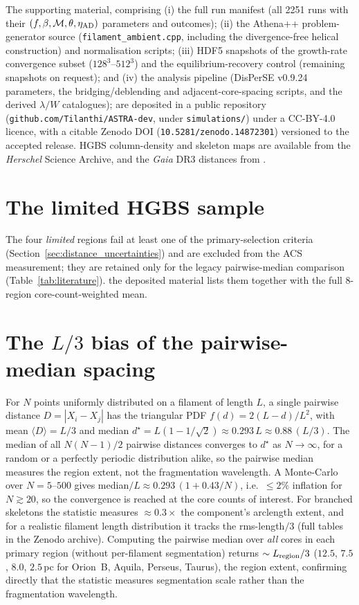 \documentclass[usenatbib,twoside,twocolumn]{mnras}
\begin{document}
The supporting material, comprising (i) the full run manifest (all 2251 runs with their $(f,\beta,\mathcal{M},\theta,\eta_{\rm AD})$ parameters and outcomes); (ii) the Athena++ problem-generator source (\texttt{filament\_ambient.cpp}, including the divergence-free helical construction) and normalisation scripts; (iii) HDF5 snapshots of the growth-rate convergence subset ($128^3$--$512^3$) and the equilibrium-recovery control (remaining snapshots on request); and (iv) the analysis pipeline (DisPerSE v0.9.24 parameters, the bridging/deblending and adjacent-core-spacing scripts, and the derived $\lambda/W$ catalogues); are deposited in a public repository (\texttt{github.com/Tilanthi/ASTRA-dev}, under \texttt{simulations/}) under a CC-BY-4.0 licence, with a citable Zenodo DOI (\texttt{10.5281/zenodo.14872301}) versioned to the accepted release. HGBS column-density and skeleton maps are available from the \textit{Herschel} Science Archive, and the \textit{Gaia} DR3 distances from \citet{Zhang2023}.


\appendix

\section{The limited HGBS sample}
\label{sec:limited_sample}
The four \emph{limited} regions fail at least one of the primary-selection criteria (Section~\ref{sec:distance_uncertainties}) and are excluded from the ACS measurement; they are retained only for the legacy pairwise-median comparison (Table~\ref{tab:literature}). the deposited material lists them together with the full 8-region core-count-weighted mean.



\section{The $L/3$ bias of the pairwise-median spacing}
\label{sec:pwmedian}
For $N$ points uniformly distributed on a filament of length $L$, a single pairwise distance $D=|X_i-X_j|$ has the triangular PDF $f(d)=2(L-d)/L^2$, with mean $\langle D\rangle=L/3$ and median $d^\star=L(1-1/\sqrt{2})\approx0.293\,L\approx0.88\,(L/3)$. The median of all $N(N-1)/2$ pairwise distances converges to $d^\star$ as $N\to\infty$, for a random or a perfectly periodic distribution alike, so the pairwise median measures the region extent, not the fragmentation wavelength. A Monte-Carlo over $N=5$--$500$ gives median$/L\approx0.293\,(1+0.43/N)$, i.e.\ $\le2\%$ inflation for $N\gtrsim20$, so the convergence is reached at the core counts of interest. For branched skeletons the statistic measures $\approx0.3\times$ the component's arclength extent, and for a realistic filament length distribution it tracks the rms-length$/3$ (full tables in the Zenodo archive). Computing the pairwise median over \emph{all} cores in each primary region (without per-filament segmentation) returns $\sim L_{\rm region}/3$ ($12.5$, $7.5$, $8.0$, $2.5$\,pc for Orion~B, Aquila, Perseus, Taurus), the region extent, confirming directly that the statistic measures segmentation scale rather than the fragmentation wavelength.
\end{document}

